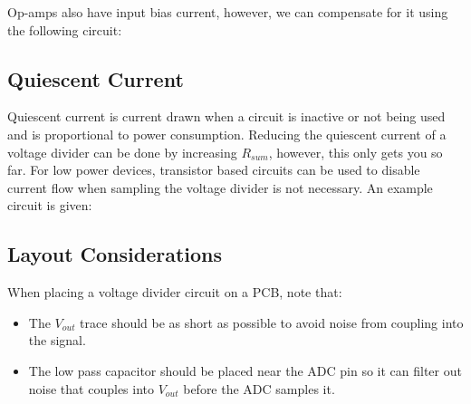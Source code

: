 \documentclass[main.tex]{subfiles}
\begin{document}

Op-amps also have input bias current, however, we can compensate for it using the following circuit:


\subsection{Quiescent Current}
Quiescent current is current drawn when a circuit is inactive or not being used and is proportional to power consumption. Reducing the quiescent current of a voltage divider can be done by increasing $R_{sum}$, however, this only gets you so far. For low power devices, transistor based circuits can be used to disable current flow when sampling the voltage divider is not necessary. An example circuit is given:  


\subsection{Layout Considerations}
When placing a voltage divider circuit on a PCB, note that:
\begin{itemize}
    \item The $V_{out}$ trace should be as short as possible to avoid noise from coupling into the signal. 
    \item The low pass capacitor should be placed near the ADC pin so it can filter out noise that couples into $V_{out}$ before the ADC samples it.
\end{itemize}
\end{document}
